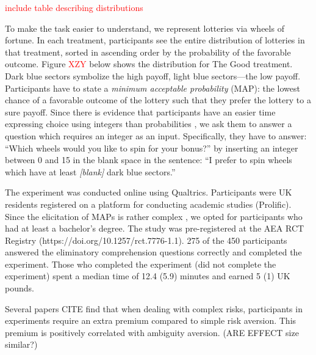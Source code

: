 \textcolor{red}{include table describing distributions}

To make the task easier to understand, we represent lotteries via wheels of fortune.
In each treatment, participants see the entire distribution of lotteries in that treatment, sorted in ascending order by the probability of the favorable outcome.
Figure \textcolor{red}{XZY} below shows the distribution for The Good treatment.
Dark blue sectors symbolize the high payoff, light blue sectors---the low payoff.
Participants have to state a \textit{minimum acceptable probability} (MAP): the lowest chance of a favorable outcome of the lottery such that they prefer the lottery to a sure payoff.
Since there is evidence that participants have an easier time expressing choice using integers than probabilities \citep{Quercia2016}, we ask them to answer a question which requires an integer as an input.
Specifically, they have to answer: ``Which wheels would you like to spin for your bonus?'' by inserting an integer between 0 and 15 in the blank space in the sentence: ``I prefer to spin wheels which have at least \textit{[blank]} dark blue sectors.''

The experiment was conducted online using Qualtrics.
Participants were UK residents registered on a platform for conducting academic studies (Prolific).
Since the elicitation of MAPs is rather complex \citep{Quercia2016,Polipciuc2020}, we opted for participants who had at least a bachelor's degree.
The study was pre-registered at the AEA RCT Registry (https://doi.org/10.1257/rct.7776-1.1).
275 of the 450 participants answered the eliminatory comprehension questions correctly and completed the experiment.
Those who completed the experiment (did not complete the experiment) spent a median time of 12.4 (5.9) minutes and earned 5 (1) UK pounds.




Several papers CITE find that when dealing with complex risks, participants in experiments require an extra premium compared to simple risk aversion.
This premium is positively correlated with ambiguity aversion. (ARE EFFECT size similar?)


\clearpage
\pagebreak



